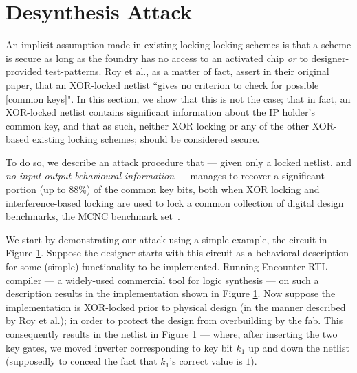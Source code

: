 \section{Desynthesis Attack}

An implicit assumption made in existing locking locking schemes is that a scheme is secure as long as the foundry has no access to an activated chip \emph{or} to designer-provided test-patterns\cite{plaza2015solving}. Roy et al., as a matter of fact, assert in their original paper, that an XOR-locked netlist ``gives no criterion to check for possible [common keys]"\cite{}.  In this section, we show that this is not the case; that in fact, an XOR-locked netlist contains significant information about the IP holder's common key, and that as such, neither XOR locking or any of the other XOR-based existing locking schemes; should be considered secure.

To do so, we describe an attack procedure that --- given only a locked netlist, and \emph{no input-output behavioural information} --- manages to recover a significant portion  (up to 88\%) of the common key bits, both when XOR locking and interference-based locking are used to lock a common collection of digital design benchmarks, the MCNC benchmark set~\cite{}. 

We start by demonstrating our attack using a simple example, the circuit in Figure \ref{}. Suppose the designer starts with this circuit as a behavioral description for some (simple) functionality to be implemented. Running Encounter RTL compiler --- a widely-used \cite{} commercial tool for logic synthesis --- on such a description results in the implementation shown in Figure \ref{}. Now suppose the implementation is XOR-locked prior to physical design (in the manner described by Roy et al.); in order to protect the design from overbuilding by the fab. This consequently results in the netlist in Figure \ref{} --- where, after inserting the two key gates, we moved inverter corresponding to key bit $k_1$ up and down the netlist (supposedly to conceal the fact that $k_1$'s correct value is $1$).

